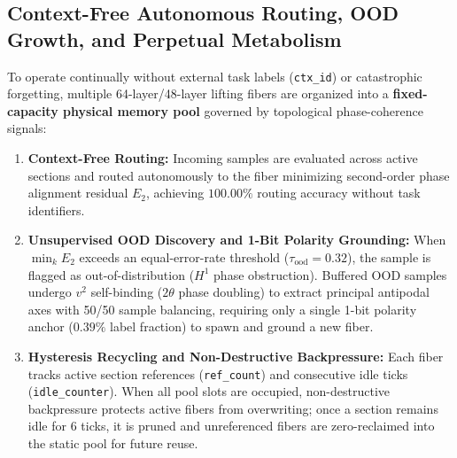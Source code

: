 \documentclass[11pt, a4paper]{article}
\begin{document}
\subsection{Context-Free Autonomous Routing, OOD Growth, and Perpetual Metabolism}
To operate continually without external task labels (\texttt{ctx\_id}) or catastrophic forgetting, multiple 64-layer/48-layer lifting fibers are organized into a \textbf{fixed-capacity physical memory pool} governed by topological phase-coherence signals:
\begin{enumerate}
    \item \textbf{Context-Free Routing:} Incoming samples are evaluated across active sections and routed autonomously to the fiber minimizing second-order phase alignment residual $E_2$, achieving $100.00\%$ routing accuracy without task identifiers.
    \item \textbf{Unsupervised OOD Discovery and 1-Bit Polarity Grounding:} When $\min_k E_2$ exceeds an equal-error-rate threshold ($\tau_{\mathrm{ood}} = 0.32$), the sample is flagged as out-of-distribution ($H^1$ phase obstruction). Buffered OOD samples undergo $v^2$ self-binding ($2\theta$ phase doubling) to extract principal antipodal axes with 50/50 sample balancing, requiring only a single 1-bit polarity anchor ($0.39\%$ label fraction) to spawn and ground a new fiber.
    \item \textbf{Hysteresis Recycling and Non-Destructive Backpressure:} Each fiber tracks active section references (\texttt{ref\_count}) and consecutive idle ticks (\texttt{idle\_counter}). When all pool slots are occupied, non-destructive backpressure protects active fibers from overwriting; once a section remains idle for 6 ticks, it is pruned and unreferenced fibers are zero-reclaimed into the static pool for future reuse.
\end{enumerate}
\end{document}
